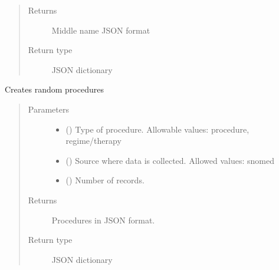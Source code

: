 \documentclass[letterpaper,10pt,english]{sphinxmanual}
\begin{document}
\begin{fulllineitems}
\begin{fulllineitems}
\begin{quote}
\begin{description}
\item[{Returns}] \leavevmode
\sphinxAtStartPar
Middle name JSON format

\item[{Return type}] \leavevmode
\sphinxAtStartPar
JSON dictionary

\end{description}\end{quote}

\end{fulllineitems}


\begin{fulllineitems}
\label{\detokenize{CE_app.synth_phr:CE_app.synth_phr.functions.Domains.procedure}}
\sphinxAtStartPar
Creates random procedures
\begin{quote}\begin{description}
\item[{Parameters}] \leavevmode\begin{itemize}
\item {} 
\sphinxAtStartPar
{} () \textendash{} Type of procedure. Allowable values: procedure, regime/therapy

\item {} 
\sphinxAtStartPar
{} () \textendash{} Source where data is collected. Allowed values: snomed

\item {} 
\sphinxAtStartPar
{} () \textendash{} Number of records.

\end{itemize}

\item[{Returns}] \leavevmode
\sphinxAtStartPar
Procedures in JSON format.

\item[{Return type}] \leavevmode
\sphinxAtStartPar
JSON dictionary


\end{description}
\end{quote}
\end{fulllineitems}
\end{fulllineitems}
\end{document}

